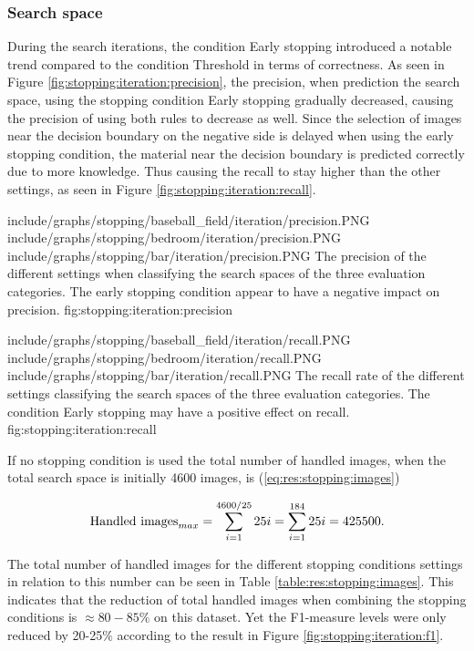 \subsubsection{Search space}
\label{sec:result:stopping:iterations}
During the search iterations, the condition Early stopping introduced a notable trend compared to the condition Threshold in terms of correctness. As seen in Figure \ref{fig:stopping:iteration:precision}, the precision, when prediction the search space, using the stopping condition Early stopping gradually decreased, causing the precision of using both rules to decrease as well. Since the selection of images near the decision boundary on the negative side is delayed when using the early stopping condition, the material near the decision boundary is predicted correctly due to more knowledge. Thus causing the recall to stay higher than the other settings, as seen in Figure \ref{fig:stopping:iteration:recall}.

\tripfigurenear
{include/graphs/stopping/baseball_field/iteration/precision.PNG}
{include/graphs/stopping/bedroom/iteration/precision.PNG}
{include/graphs/stopping/bar/iteration/precision.PNG}
{The precision of the different settings when classifying the search spaces of the three evaluation categories. The early stopping condition appear to have a negative impact on precision.}
{fig:stopping:iteration:precision}

\tripfigurenear
{include/graphs/stopping/baseball_field/iteration/recall.PNG}
{include/graphs/stopping/bedroom/iteration/recall.PNG}
{include/graphs/stopping/bar/iteration/recall.PNG}
{The recall rate of the different settings classifying the search spaces of the three evaluation categories. The condition Early stopping may have a positive effect on recall.}
{fig:stopping:iteration:recall}

If no stopping condition is used the total number of handled images, when the total search space is initially 4600 images, is (\ref{eq:res:stopping:images})

\begin{equation}
\label{eq:res:stopping:images}
\textnormal{Handled images}_{max} = \sum_{i=1}^{4600/25}{25i} =\sum_{i=1}^{184}{25i} = 425500.
\end{equation}

The total number of handled images for the different stopping conditions settings in relation to this number can be seen in Table \ref{table:res:stopping:images}. This indicates that the reduction of total handled images when combining the stopping conditions is $\approx80-85\%$ on this dataset. Yet the F1-measure levels were only reduced by 20-25\% according to the result in Figure \ref{fig:stopping:iteration:f1}. 

